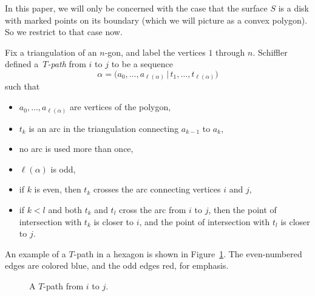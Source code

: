In this paper, we will only be concerned with the case that the surface $S$ is a disk with marked points on its boundary (which we will
picture as a convex polygon). So we restrict to that case now.

Fix a triangulation of an $n$-gon, and label the vertices $1$ through $n$.
Schiffler~\cite{schiffler_08} defined a~\emph{$T$-path} from $i$ to $j$ to be a sequence
\[ \alpha = \big(a_0,\dots,a_{\ell(\alpha)} \,|\, t_1,\dots,t_{\ell(\alpha)}\big) \]
such that
\begin{itemize}\itemsep=0pt
 \item[(T1)] $a_0,\dots,a_{\ell(\alpha)}$ are vertices of the polygon,
 \item[(T2)] $t_k$ is an arc in the triangulation connecting $a_{k-1}$ to $a_k$,
 \item[(T3)] no arc is used more than once,
 \item[(T4)] $\ell(\alpha)$ is odd,
 \item[(T5)] if $k$ is even, then $t_k$ crosses the arc connecting vertices $i$ and $j$,
 \item[(T6)] if $k < l$ and both $t_k$ and $t_l$ cross the arc from $i$ to $j$, then
 the point of intersection with $t_k$ is closer to $i$, and the point of intersection
 with $t_l$ is closer to $j$.
\end{itemize}

An example of a $T$-path in a hexagon is shown in Figure~\ref{fig:t_path}.
The even-numbered edges are colored blue, and the odd edges red, for emphasis.

\begin{figure}[h!] \centering


 \caption{A $T$-path from $i$ to $j$.} \label {fig:t_path}
\end{figure}

